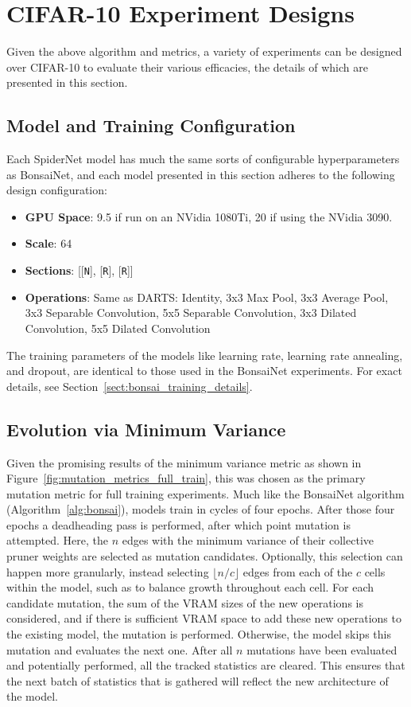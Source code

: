 \section{CIFAR-10 Experiment Designs}\label{sect:spider_experiments}
Given the above algorithm and metrics, a variety of experiments can be designed over CIFAR-10 to evaluate their various efficacies,
the details of which are presented in this section.

\subsection{Model and Training Configuration}
Each SpiderNet model has much the same sorts of configurable hyperparameters
as BonsaiNet, and each model presented in this section adheres to the following design configuration:

\begin{itemize}   \setlength\itemsep{-.2em}
	\item \textbf{GPU Space}: 9.5 if run on an NVidia 1080Ti, 20 if using the NVidia 3090.
	\item \textbf{Scale}: 64
	\item \textbf{Sections}: [[\texttt{N}], [\texttt{R}], [\texttt{R}]]
	\item \textbf{Operations}: Same as DARTS: Identity, 3x3 Max Pool, 3x3 Average Pool, 3x3 Separable Convolution, 5x5 Separable Convolution,
	3x3 Dilated Convolution, 5x5 Dilated Convolution
\end{itemize}

The training parameters of the models like learning rate, learning rate annealing, and dropout,
are identical to those used in the BonsaiNet experiments. For exact details, see Section~\ref{sect:bonsai_training_details}.

\subsection{Evolution via Minimum Variance}
Given the promising results of the minimum variance metric as shown in Figure~\ref{fig:mutation_metrics_full_train},
this was chosen as the primary mutation metric for full training experiments. Much like the BonsaiNet algorithm
(Algorithm~\ref{alg:bonsai}), models train in cycles of four epochs. After those four epochs a deadheading pass is performed,
after which point mutation is attempted. Here, the $n$ edges with the minimum variance of their collective pruner weights
are selected as mutation candidates. Optionally, this selection can happen more granularly, instead selecting $\lfloor n/c \rfloor$ edges
from each of the $c$ cells within the model, such as to balance growth throughout each cell.
For each candidate mutation, the sum of the VRAM sizes of the new operations is
considered, and if there is sufficient VRAM space to add these new operations to the existing model, the mutation is
performed. Otherwise, the model skips this mutation and evaluates the next one. After all $n$ mutations have been evaluated
and potentially performed, all the tracked statistics are cleared. This ensures that the next batch of statistics
that is gathered will reflect the new architecture of the model.

